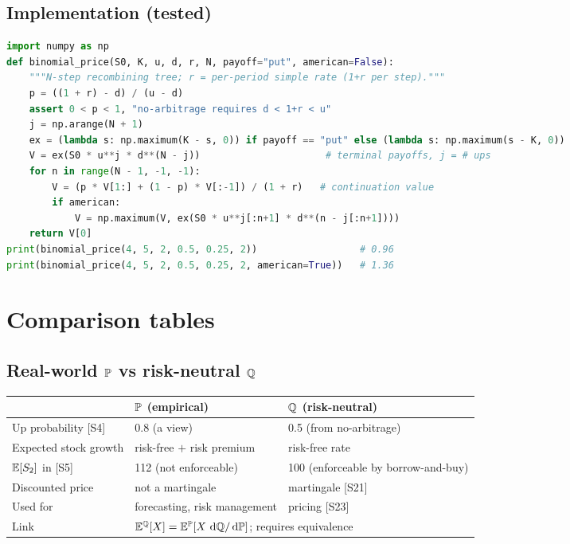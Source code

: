 \documentclass[10pt]{article}
\begin{document}
\subsection{Implementation \beyond{} (tested)}
\begin{lstlisting}[language=Python]
import numpy as np
def binomial_price(S0, K, u, d, r, N, payoff="put", american=False):
    """N-step recombining tree; r = per-period simple rate (1+r per step)."""
    p = ((1 + r) - d) / (u - d)
    assert 0 < p < 1, "no-arbitrage requires d < 1+r < u"
    j = np.arange(N + 1)
    ex = (lambda s: np.maximum(K - s, 0)) if payoff == "put" else (lambda s: np.maximum(s - K, 0))
    V = ex(S0 * u**j * d**(N - j))                      # terminal payoffs, j = # ups
    for n in range(N - 1, -1, -1):
        V = (p * V[1:] + (1 - p) * V[:-1]) / (1 + r)   # continuation value
        if american:
            V = np.maximum(V, ex(S0 * u**j[:n+1] * d**(n - j[:n+1])))
    return V[0]
print(binomial_price(4, 5, 2, 0.5, 0.25, 2))                  # 0.96
print(binomial_price(4, 5, 2, 0.5, 0.25, 2, american=True))   # 1.36
\end{lstlisting}

\section{Comparison tables}
\subsection{Real-world $\mathbb{P}$ vs risk-neutral $\mathbb{Q}$}
{\small\begin{tabularx}{\linewidth}{@{}l X X@{}}\toprule
 & $\mathbb{P}$ (empirical) & $\mathbb{Q}$ (risk-neutral)\\\midrule
Up probability [S4] & 0.8 (a view) & 0.5 (from no-arbitrage)\\
Expected stock growth & risk-free $+$ risk premium & risk-free rate\\
$\mathbb{E}[S_2]$ in [S5] & 112 (not enforceable) & 100 (enforceable by borrow-and-buy)\\
Discounted price & not a martingale & martingale [S21]\\
Used for & forecasting, risk management & pricing [S23]\\
Link & \multicolumn{2}{l}{$\mathbb{E}^{\mathbb{Q}}[X]=\mathbb{E}^{\mathbb{P}}[X\,\,\mathrm{d}\mathbb{Q}/\,\mathrm{d}\mathbb{P}]$; requires equivalence}\\\bottomrule
\end{tabularx}}
\end{document}
